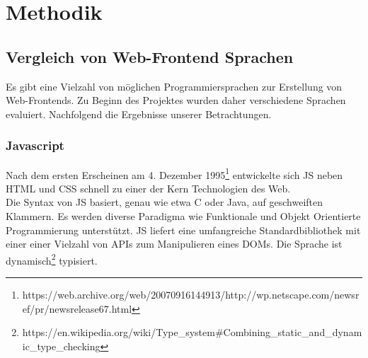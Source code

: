 \chapter{Methodik}
\section{Vergleich von Web-Frontend Sprachen}
Es gibt eine Vielzahl von möglichen Programmiersprachen zur Erstellung von
Web-Frontends. Zu Beginn des Projektes wurden daher verschiedene Sprachen
evaluiert. Nachfolgend die Ergebnisse unserer Betrachtungen.
\subsection{Javascript}
Nach dem ersten Erscheinen am 4. Dezember
1995\footnote{https://web.archive.org/web/20070916144913/http://wp.netscape.com/newsref/pr/newsrelease67.html}
entwickelte sich \ac{JS} neben \ac{HTML} und \ac{CSS} schnell zu einer der Kern
Technologien des Web.\\
Die Syntax von \ac{JS} basiert, genau wie etwa C oder
Java, auf geschweiften Klammern. Es werden diverse Paradigma wie Funktionale und
Objekt Orientierte Programmierung unterstützt. \acl{JS} liefert eine umfangreiche
Standardbibliothek mit einer einer Vielzahl von
\ac{API}s zum Manipulieren eines \ac{DOM}s. Die Sprache ist
dynamisch\footnote{https://en.wikipedia.org/wiki/Type\_system\#Combining\_static\_and\_dynamic\_type\_checking}
typisiert.
